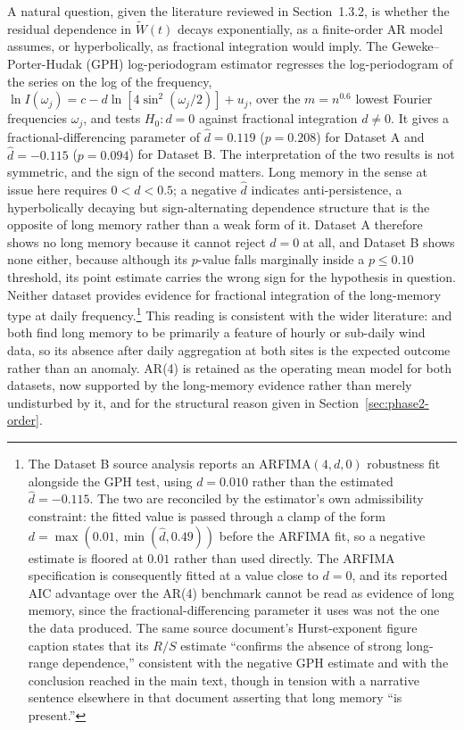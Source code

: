 A natural question, given the literature reviewed in Section~1.3.2, is whether the residual dependence in $\widetilde W(t)$ decays exponentially, as a finite-order AR model assumes, or hyperbolically, as fractional integration would imply. The Geweke--Porter-Hudak (GPH) log-periodogram estimator regresses the log-periodogram of the series on the log of the frequency, $\ln I(\omega_j) = c - d\ln\left[4\sin^2(\omega_j/2)\right] + u_j$, over the $m = n^{0.6}$ lowest Fourier frequencies $\omega_j$, and tests $H_0: d = 0$ against fractional integration $d \neq 0$. It gives a fractional-differencing parameter of $\hat d = 0.119$ ($p = 0.208$) for Dataset A and $\hat d = -0.115$ ($p = 0.094$) for Dataset B. The interpretation of the two results is not symmetric, and the sign of the second matters. Long memory in the sense at issue here requires $0 < d < 0.5$; a negative $\hat d$ indicates anti-persistence, a hyperbolically decaying but sign-alternating dependence structure that is the opposite of long memory rather than a weak form of it. Dataset A therefore shows no long memory because it cannot reject $d = 0$ at all, and Dataset B shows none either, because although its $p$-value falls marginally inside a $p \le 0.10$ threshold, its point estimate carries the wrong sign for the hypothesis in question. Neither dataset provides evidence for fractional integration of the long-memory type at daily frequency.\footnote{The Dataset B source analysis reports an ARFIMA$(4,d,0)$ robustness fit alongside the GPH test, using $d = 0.010$ rather than the estimated $\hat d = -0.115$. The two are reconciled by the estimator's own admissibility constraint: the fitted value is passed through a clamp of the form $d = \max(0.01, \min(\hat d, 0.49))$ before the ARFIMA fit, so a negative estimate is floored at $0.01$ rather than used directly. The ARFIMA specification is consequently fitted at a value close to $d = 0$, and its reported AIC advantage over the AR(4) benchmark cannot be read as evidence of long memory, since the fractional-differencing parameter it uses was not the one the data produced. The same source document's Hurst-exponent figure caption states that its $R/S$ estimate ``confirms the absence of strong long-range dependence,'' consistent with the negative GPH estimate and with the conclusion reached in the main text, though in tension with a narrative sentence elsewhere in that document asserting that long memory ``is present.''} This reading is consistent with the wider literature: \citet{HaslettRaftery1989} and \citet{KavasseriSeetharaman2009} both find long memory to be primarily a feature of hourly or sub-daily wind data, so its absence after daily aggregation at both sites is the expected outcome rather than an anomaly. AR(4) is retained as the operating mean model for both datasets, now supported by the long-memory evidence rather than merely undisturbed by it, and for the structural reason given in Section~\ref{sec:phase2-order}.


